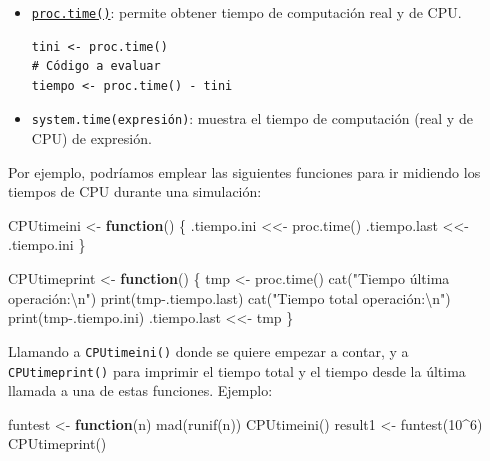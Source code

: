\documentclass[
  10pt,
]{book}
\newenvironment{Shaded}{\begin{snugshade}}{\end{snugshade}}
\newcommand{\ControlFlowTok}[1]{\textcolor[rgb]{0.13,0.29,0.53}{\textbf{#1}}}
\newcommand{\DecValTok}[1]{\textcolor[rgb]{0.00,0.00,0.81}{#1}}
\newcommand{\FunctionTok}[1]{\textcolor[rgb]{0.00,0.00,0.00}{#1}}
\newcommand{\NormalTok}[1]{#1}
\newcommand{\OtherTok}[1]{\textcolor[rgb]{0.56,0.35,0.01}{#1}}
\newcommand{\SpecialCharTok}[1]{\textcolor[rgb]{0.00,0.00,0.00}{#1}}
\newcommand{\StringTok}[1]{\textcolor[rgb]{0.31,0.60,0.02}{#1}}
\theoremstyle{break}
\theoremstyle{nonumberplain}
\begin{document}
\begin{itemize}
\item
  \href{https://rdrr.io/r/base/proc.time.html}{\texttt{proc.time()}}: permite obtener tiempo de computación real
  y de CPU.

\begin{verbatim}
tini <- proc.time()
# Código a evaluar
tiempo <- proc.time() - tini
\end{verbatim}
\item
  \texttt{system.time(expresión)}: muestra el tiempo de computación (real y
  de CPU) de expresión.
\end{itemize}

Por ejemplo, podríamos emplear las siguientes funciones para ir midiendo los tiempos de CPU durante una simulación:

\begin{Shaded}
\begin{Highlighting}[]
\NormalTok{CPUtimeini }\OtherTok{\textless{}{-}} \ControlFlowTok{function}\NormalTok{() \{}
\NormalTok{  .tiempo.ini }\OtherTok{\textless{}\textless{}{-}} \FunctionTok{proc.time}\NormalTok{()}
\NormalTok{  .tiempo.last }\OtherTok{\textless{}\textless{}{-}}\NormalTok{ .tiempo.ini}
\NormalTok{\}}

\NormalTok{CPUtimeprint }\OtherTok{\textless{}{-}} \ControlFlowTok{function}\NormalTok{() \{}
\NormalTok{  tmp }\OtherTok{\textless{}{-}} \FunctionTok{proc.time}\NormalTok{()}
  \FunctionTok{cat}\NormalTok{(}\StringTok{"Tiempo última operación:}\SpecialCharTok{\textbackslash{}n}\StringTok{"}\NormalTok{)}
  \FunctionTok{print}\NormalTok{(tmp}\SpecialCharTok{{-}}\NormalTok{.tiempo.last)}
  \FunctionTok{cat}\NormalTok{(}\StringTok{"Tiempo total operación:}\SpecialCharTok{\textbackslash{}n}\StringTok{"}\NormalTok{)}
  \FunctionTok{print}\NormalTok{(tmp}\SpecialCharTok{{-}}\NormalTok{.tiempo.ini)}
\NormalTok{  .tiempo.last }\OtherTok{\textless{}\textless{}{-}}\NormalTok{ tmp}
\NormalTok{\}}
\end{Highlighting}
\end{Shaded}

Llamando a \texttt{CPUtimeini()} donde se quiere empezar a contar, y a \texttt{CPUtimeprint()} para imprimir el tiempo total y el tiempo desde la última llamada a una de estas funciones.
Ejemplo:

\begin{Shaded}
\begin{Highlighting}[]
\NormalTok{funtest }\OtherTok{\textless{}{-}} \ControlFlowTok{function}\NormalTok{(n) }\FunctionTok{mad}\NormalTok{(}\FunctionTok{runif}\NormalTok{(n)) }
\FunctionTok{CPUtimeini}\NormalTok{()}
\NormalTok{result1 }\OtherTok{\textless{}{-}} \FunctionTok{funtest}\NormalTok{(}\DecValTok{10}\SpecialCharTok{\^{}}\DecValTok{6}\NormalTok{)}
\FunctionTok{CPUtimeprint}\NormalTok{()}
\end{Highlighting}
\end{Shaded}
\end{document}
